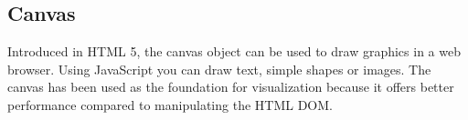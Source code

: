 \subsection{Canvas}
Introduced in HTML 5, the canvas object can be used to draw graphics in a web browser. Using JavaScript you can draw text, simple shapes or images. The canvas has been used as the foundation for visualization because it offers better performance compared to manipulating the HTML DOM.